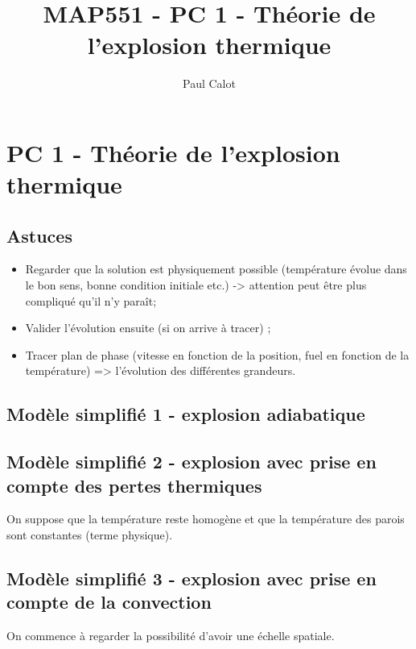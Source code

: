 \documentclass[10pt,a4paper,twocolumn]{article}
\author{Paul Calot}
\title{MAP551 - PC 1 - Théorie de l’explosion thermique}
\begin{document}
\maketitle

\chapter{PC 1 - Théorie de l'explosion thermique}

\section{Astuces}

\begin{itemize}
 \item Regarder que la solution est physiquement possible (température évolue dans le bon sens, bonne condition initiale etc.) -> attention peut être plus compliqué qu'il n'y paraît;
 \item Valider l'évolution ensuite (si on arrive à tracer) ;
 \item Tracer plan de phase (vitesse en fonction de la position, fuel en fonction de la température) => l'évolution des différentes grandeurs.
\end{itemize}

\section{Modèle simplifié 1 - explosion adiabatique}


\section{Modèle simplifié 2 - explosion avec prise en compte des pertes thermiques}

On suppose que la température reste homogène et que la température des parois sont constantes (terme physique).

\section{Modèle simplifié 3 - explosion avec prise en compte de la convection}
On commence à regarder la possibilité d'avoir une échelle spatiale.
\end{document}
